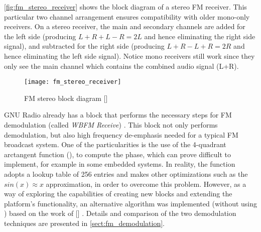 \autoref{fig:fm_stereo_receiver} shows the block diagram of a stereo FM receiver. This particular two channel arrangement ensures compatibility with older mono-only receivers. On a stereo receiver, the main and secondary channels are added for the left side (producing $L+R+L-R=2L$ and hence eliminating the right side signal), and subtracted for the right side (producing $L+R-L+R=2R$ and hence eliminating the left side signal). Notice mono receivers still work since they only see the main channel which contains the combined audio signal (L+R).

\begin{figure}[H]
  \centering
  \texttt{[image: fm\_stereo\_receiver]}
  \caption{FM stereo block diagram [\citeauthor{HOOD199857}]}
  \label{fig:fm_stereo_receiver}
\end{figure}

GNU Radio already has a block that performs the necessary steps for FM demodulation (called \emph{WBFM Receive}) \cite{gnuradio_wbfm_receiver}. This block not only performs demodulation, but also high frequency de-emphasis needed for a typical FM broadcast system. One of the particularities is the use of the 4-quadrant arctangent function (), to compute the phase, which can prove difficult to implement, for example in some embedded systems. In reality, the function adopts a lookup table of 256 entries and makes other optimizations such as the $sin(x) \approx x$ approximation, in order to overcome this problem. However, as a way of exploring the capabilities of creating new blocks and extending the platform's functionality, an alternative algorithm was implemented (without using ) based on the work of [\citeauthor{lyons2004}] \cite{wbfm_alt_receiver}. Details and comparison of the two demodulation techniques are presented in \autoref{sect:fm_demodulation}.

